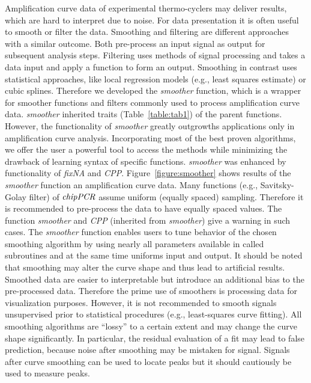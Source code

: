 \documentclass[twocolumn]{bmcart}%
\begin{document}
  Amplification curve data of experimental thermo-cyclers may deliver results, 
which are hard to interpret due to noise. For data presentation it 
is often useful to smooth or filter the data. Smoothing and filtering are 
different approaches with a similar outcome. Both pre-process an input signal as 
output for subsequent analysis steps. Filtering uses methods of signal 
processing and takes a data input and apply a function to form an output. 
Smoothing in contrast uses statistical approaches, like local 
regression models (e.g., least squares estimate) or cubic splines. 
Therefore we developed the \textsl{smoother} function, which is a wrapper for 
smoother functions and filters commonly used to process amplification curve 
data. \textsl{smoother} inherited traits (Table~\ref{table:tab1})  of the 
parent functions. However, the functionality of \textsl{smoother} greatly 
outgrowths applications only in amplification curve analysis. Incorporating most 
of the best proven algorithms, we offer the user a powerful tool to access the 
methods while minimizing the drawback of learning syntax of specific functions. 
\textsl{smoother} was enhanced by functionality of \textsl{fixNA} and 
\textsl{CPP}. Figure~\ref{figure:smoother} shows results of the 
\textsl{smoother} function an amplification curve data. Many functions (e.g., 
Savitsky-Golay filter) of $\emph{chipPCR}$ assume uniform (equally spaced) 
sampling. Therefore it is recommended to pre-process the data to have equally 
spaced values. The function \textsl{smoother} and \textsl{CPP} (inherited from 
\textsl{smoother}) give a warning in such cases. The \textsl{smoother} function 
enables users to tune behavior of the chosen smoothing algorithm by using nearly 
all parameters available in called subroutines and at the same time uniforms 
input and output. It should be noted that smoothing may alter the curve shape 
and thus lead to artificial results. Smoothed data are easier to interpretable 
but introduce an additional bias to the pre-processed data. Therefore the prime 
use of smoothers is processing data for visualization purposes. However, it is 
not recommended to smooth signals unsupervised prior to statistical procedures 
(e.g., least-squares curve fitting). All smoothing algorithms are ``lossy'' to a 
certain extent and may change the curve shape significantly. In particular, the 
residual evaluation of a fit may lead to false prediction, because noise after 
smoothing may be mistaken for signal. Signals after curve smoothing can be used 
to locate peaks but it should cautiously be used to measure peaks.
\end{document}
